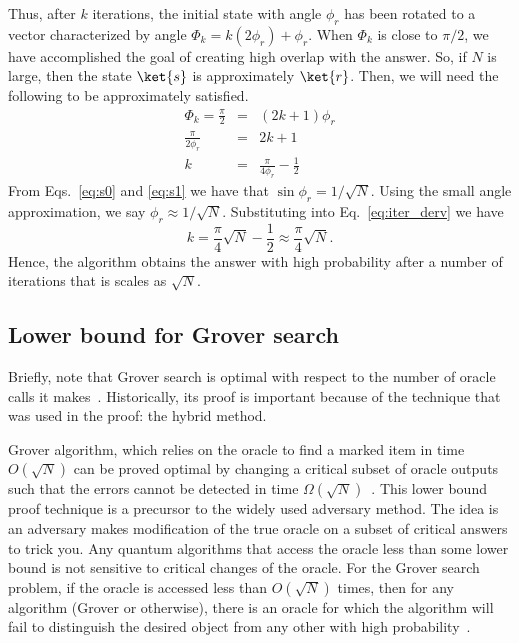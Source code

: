 \documentclass[11pt,oneside,final]{huthesis}%
\begin{document}
Thus, after $k$ iterations, the initial state with angle $\phi_r$ has been rotated to a vector characterized by angle $\Phi_k=k(2\phi_r)+\phi_r$.  When $\Phi_k$ is close to $\pi/2$, we have accomplished the goal of creating high overlap with the answer.  So, if $N$ is large, then the state $\ket{s}$ is approximately $\ket{r}$.  Then, we will need the following to be approximately satisfied.
\begin{eqnarray}
	\Phi_k=\frac{\pi}{2}&=&(2k+1)\phi_r\\
	\frac{\pi}{2\phi_r}&=& 2k+1\\
	k&=& \frac{\pi}{4\phi_r}-\frac{1}{2}
	\label{eq:iter_derv}
\end{eqnarray}
From Eqs.~\eqref{eq:s0} and \eqref{eq:s1} we have that $\sin\phi_r=1/\sqrt{N}$.  Using the small angle approximation, we say $\phi_r\approx 1/\sqrt{N}$.  Substituting into Eq.~\eqref{eq:iter_derv} we have
\begin{equation}
	k= \frac{\pi}{4}\sqrt{N}-\frac{1}{2}\approx \frac{\pi}{4}\sqrt{N}.
	\label{eq:scaling}
\end{equation}
Hence, the algorithm obtains the answer with high probability after a number of iterations that is scales as $\sqrt{N}$.


\subsection{Lower bound for Grover search}
Briefly, note that Grover search  is optimal with respect to the number of oracle calls it makes~\cite{Preskill98,Bennett97}.  Historically, its proof is important because of the technique that was used in the proof: the hybrid method. 

Grover algorithm, which relies on the oracle to find a marked item in time $O(\sqrt{N})$ can be proved optimal by changing a critical subset of oracle outputs such that the errors cannot be detected in time $\Omega(\sqrt{N})$~\cite{Bennett97}. This lower bound proof technique is a precursor to the widely used adversary method. 
The idea is an adversary makes modification of the true oracle on a subset of critical answers to trick you. Any quantum algorithms that access the oracle less than some lower bound is not sensitive to critical changes of the oracle.  For the Grover search problem, if the oracle is accessed less than $O(\sqrt{N})$ times, then for any algorithm (Grover or otherwise), there is an oracle for which the algorithm  will fail to distinguish the desired object from any other with high probability~\cite{Bennett97}. %
\end{document}
